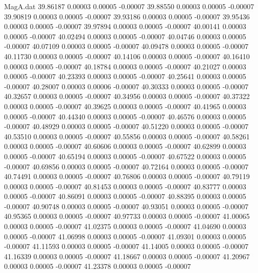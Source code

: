 \begin{filecontents}{MagA.dat}
  39.86187    0.00003    0.00005   -0.00007
  39.88550    0.00003    0.00005   -0.00007
  39.90819    0.00003    0.00005   -0.00007
  39.93186    0.00003    0.00005   -0.00007
  39.95436    0.00003    0.00005   -0.00007
  39.97894    0.00003    0.00005   -0.00007
  40.00141    0.00003    0.00005   -0.00007
  40.02494    0.00003    0.00005   -0.00007
  40.04746    0.00003    0.00005   -0.00007
  40.07109    0.00003    0.00005   -0.00007
  40.09478    0.00003    0.00005   -0.00007
  40.11730    0.00003    0.00005   -0.00007
  40.14106    0.00003    0.00005   -0.00007
  40.16410    0.00003    0.00005   -0.00007
  40.18784    0.00003    0.00005   -0.00007
  40.21027    0.00003    0.00005   -0.00007
  40.23393    0.00003    0.00005   -0.00007
  40.25641    0.00003    0.00005   -0.00007
  40.28007    0.00003    0.00006   -0.00007
  40.30333    0.00003    0.00005   -0.00007
  40.32657    0.00003    0.00005   -0.00007
  40.34956    0.00003    0.00005   -0.00007
  40.37322    0.00003    0.00005   -0.00007
  40.39625    0.00003    0.00005   -0.00007
  40.41965    0.00003    0.00005   -0.00007
  40.44340    0.00003    0.00005   -0.00007
  40.46576    0.00003    0.00005   -0.00007
  40.48929    0.00003    0.00005   -0.00007
  40.51220    0.00003    0.00005   -0.00007
  40.53510    0.00003    0.00005   -0.00007
  40.55856    0.00003    0.00005   -0.00007
  40.58261    0.00003    0.00005   -0.00007
  40.60606    0.00003    0.00005   -0.00007
  40.62899    0.00003    0.00005   -0.00007
  40.65194    0.00003    0.00005   -0.00007
  40.67522    0.00003    0.00005   -0.00007
  40.69856    0.00003    0.00005   -0.00007
  40.72164    0.00003    0.00005   -0.00007
  40.74491    0.00003    0.00005   -0.00007
  40.76806    0.00003    0.00005   -0.00007
  40.79119    0.00003    0.00005   -0.00007
  40.81453    0.00003    0.00005   -0.00007
  40.83777    0.00003    0.00005   -0.00007
  40.86091    0.00003    0.00005   -0.00007
  40.88395    0.00003    0.00005   -0.00007
  40.90748    0.00003    0.00005   -0.00007
  40.93051    0.00003    0.00005   -0.00007
  40.95365    0.00003    0.00005   -0.00007
  40.97733    0.00003    0.00005   -0.00007
  41.00065    0.00003    0.00005   -0.00007
  41.02375    0.00003    0.00005   -0.00007
  41.04690    0.00003    0.00005   -0.00007
  41.06998    0.00003    0.00005   -0.00007
  41.09301    0.00003    0.00005   -0.00007
  41.11593    0.00003    0.00005   -0.00007
  41.14005    0.00003    0.00005   -0.00007
  41.16339    0.00003    0.00005   -0.00007
  41.18667    0.00003    0.00005   -0.00007
  41.20967    0.00003    0.00005   -0.00007
  41.23378    0.00003    0.00005   -0.00007

\end{filecontents}
